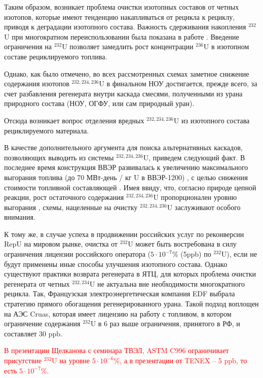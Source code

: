 Таким образом, возникает проблема очистки изотопных составов от четных изотопов, которые имеют тенденцию накапливаться от рецикла к рециклу, приводя к деградации изотопного состава.
Важность сдерживания накопления $^{232}$U при многократном переиспользовании была показана в работе \cite{smirnovEvolutionIsotopicComposition2012}.
Введение ограничения на $^{232}$U позволяет замедлить рост концентрации $^{236}$U в изотопном составе рециклируемого топлива.

Однако, как было отмечено, во всех рассмотренных схемах заметное снижение содержания изотопов $^{232,234,236}$U в финальном НОУ достигается, прежде всего, за счет разбавления регенерата внутри каскада смесями, полученными из урана природного состава (НОУ, ОГФУ, или сам природный уран).

Отсюда возникает вопрос отделения вредных $^{232,234,236}$U из изотопного состава рециклируемого материала.

В качестве дополнительного аргумента для поиска альтернативных каскадов, позволяющих выводить из системы $^{232,234,236}$U, приведем следующий факт.
В последнее время конструкция ВВЭР развивалась к увеличению максимального выгорания топлива (до 70 МВт-день / кг U в ВВЭР-1200) \cite{asmolovNewGenerationFirstofthe2017}, с целью снижения стоимости топливной составляющей \cite{andrianovaPovyshenievygoraniyaToplivaVVER2008}.
Имея ввиду, что, согласно природе цепной реакции, рост остаточного содержания $^{232,234,236}$U пропорционален уровню выгорания \cite{VeryHighBurnups2006}, схемы, нацеленные на очистку $^{232,234,236}$U заслуживают особого внимания.

К тому же, в случае успеха в продвижении российских услуг по реконверсии RepU на мировом рынке, очистка от $^{232}$U может быть востребована в силу ограничения лицензии российского оператора ($5\cdot10^{-7}$\% (5ppb) по $^{232}$U), если не будут применены иные способы улучшения изотопного состава.
Однако существуют практики возврата регенерата в ЯТЦ, для которых проблема очистки регенерата от четных $^{232,234}$U не актуальна вне необходимости многократного рецикла. Так, Французская электроэнергетическая компания EDF выбрала стратегию прямого обогащения регенерированного урана. Такой подход воплощен на АЭС Cruas, которая имеет лицензию на работу с топливом, в котором ограничение содержания $^{232}$U в 6 раз выше ограничения, принятого в РФ, и составляет 30 ppb.

\textcolor{red}{В презентации Щелканова с семинара ТВЭЛ, ASTM C996 ограничивает присутствие $^{232}$U на уровне $5\cdot10^{-6}$\%, а в презентации от TENEX -- 5 ppb, то есть $5\cdot10^{-7}$\%.}

